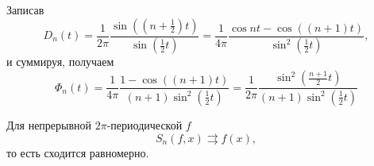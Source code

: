 Записав
\begin{equation*}
    D_n (t) 
    =
    \frac{1}{2\pi}
     \frac{\sin \left( \left(n + \frac{1}{2}\right)t\right)}{\sin \left(\frac{1}{2} t\right)} 
     = 
     \frac{1}{4\pi}
    \frac{
    \cos nt - \cos \left((n+1)t\right)
    }{
    \sin^2 \left(\frac{1}{2}t\right)
    },
\end{equation*}
и суммируя, получаем
\begin{equation*}
    \Phi_n (t) = 
    \frac{1}{4 \pi}
    \frac{
        1 - \cos \left((n+1)t\right)
    }{
        (n+1) \sin^2 \left(\frac{1}{2}t\right)
    }
    =
    \frac{1}{2\pi}
    \frac{
        \sin^2 \left(
            \frac{n+1}{2}t
        \right)
    }{
        (n+1) \sin^2 \left(\frac{1}{2}t\right)
    }
\end{equation*}


\begin{to_thr}
    Для непрерывной $2\pi$-периодической $f$ 
    \begin{equation*}
        S_n (f, x) \rightrightarrows f(x),
    \end{equation*}
    то есть сходится равномерно.
\end{to_thr}

